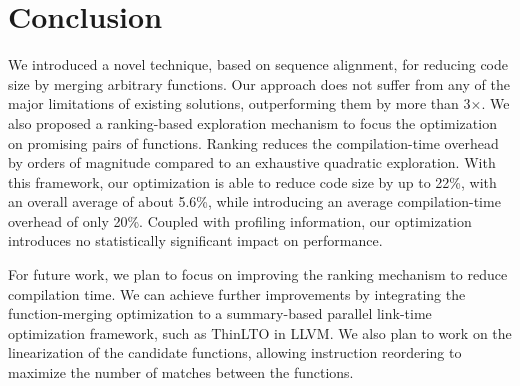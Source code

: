 \vspace{-2ex}
\section{Conclusion}

We introduced a novel technique, based on sequence alignment, for reducing
code size by merging arbitrary functions. Our approach does not suffer from
any of the major limitations of existing solutions, outperforming them by more
than 3$\times$. We also proposed a ranking-based
exploration mechanism to focus the optimization on promising pairs of
functions. Ranking reduces the compilation-time overhead by orders of magnitude
compared to an exhaustive quadratic exploration. With this framework, our
optimization is able to reduce code size by up to 22\%, with an overall average
of about 5.6\%, while introducing an average compilation-time overhead of only 20\%.
Coupled with profiling information, our optimization introduces no statistically
significant impact on performance.

For future work, we plan to focus on improving the ranking mechanism to reduce
compilation time.
We can achieve further improvements by integrating the
function-merging optimization to a summary-based parallel link-time optimization
framework, such as ThinLTO in LLVM.
We also plan to work on the linearization of the candidate functions, allowing
instruction reordering to maximize the number of matches between the functions.
